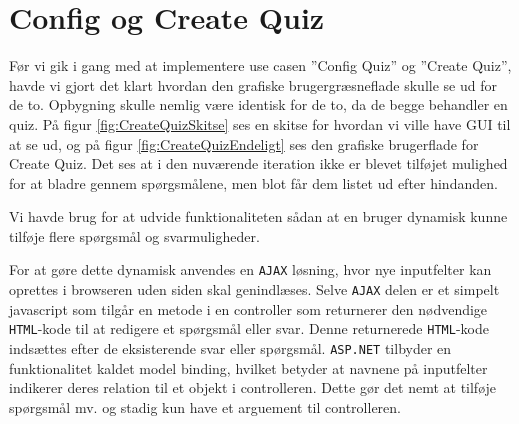 \section{Config og Create Quiz}
Før vi gik i gang med at implementere use casen ''Config Quiz'' og ''Create Quiz'', havde vi gjort det klart hvordan den grafiske brugergræsneflade skulle se ud for de to. Opbygning skulle nemlig være identisk for de to, da de begge behandler en quiz. På figur \ref{fig:CreateQuizSkitse} ses en skitse for hvordan vi ville have GUI til at se ud, og på figur \ref{fig:CreateQuizEndeligt} ses den grafiske brugerflade for Create Quiz. Det ses at i den nuværende iteration ikke er blevet tilføjet mulighed for at bladre gennem spørgsmålene, men blot får dem listet ud efter hindanden.

\begin{minipage}{0.45\textwidth}
\end{minipage}
\begin{minipage}{0.55\textwidth}
\end{minipage}

\vspace{6 mm}

Vi havde brug for at udvide funktionaliteten sådan at en bruger dynamisk kunne tilføje flere spørgsmål og svarmuligheder.

For at gøre dette dynamisk anvendes en \verb+AJAX+ løsning, hvor nye inputfelter kan oprettes i browseren uden siden skal genindlæses.
Selve \verb+AJAX+ delen er et simpelt javascript som tilgår en metode i en controller som returnerer den nødvendige \verb+HTML+-kode til at redigere et spørgsmål eller svar. Denne returnerede \verb+HTML+-kode indsættes efter de eksisterende svar eller spørgsmål. \verb+ASP.NET+ tilbyder en funktionalitet kaldet model binding, hvilket betyder at navnene på inputfelter indikerer deres relation til et objekt i controlleren. Dette gør det nemt at tilføje spørgsmål mv. og stadig kun have et arguement til controlleren.